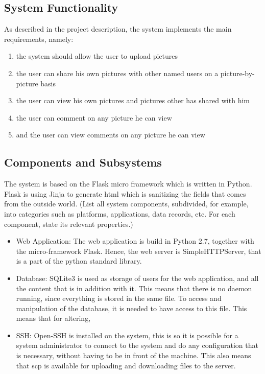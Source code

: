 \documentclass{article}
\begin{document}
\subsection{System Functionality}

As described in the project description, the system implements the main requirements, namely:

\begin{enumerate}
\item the system should allow the user to upload pictures 
\item the user can share his own pictures with other named users on a picture-by-picture basis
\item the user can view his own pictures and pictures other has shared with him
\item the user can comment on any picture he can view
\item and the user can view comments on any picture he can view  
\end{enumerate}



\subsection{Components and Subsystems}
The system is based on the Flask micro framework which is written in Python. Flask is using Jinja to generate html which is sanitizing the fields that comes from the outside world. 
(List all system components, subdivided, for example, into
  categories such as platforms, applications, data records, etc. For
  each component, state its relevant properties.)
  
\begin{itemize}
\item Web Application: The web application is build in Python 2.7, together with the micro-framework Flask. Hence, the web server is SimpleHTTPServer, that is a part of the python standard library.

\item Database: SQLite3 is used as storage of users for the web application, and all the content that is in addition with it. This means that there is no daemon running, since everything is stored in the same file. To access and manipulation of the database, it is needed to have access to this file. This means that for altering, 

\item SSH: Open-SSH is installed on the system, this is so it is possible for a system administrator to connect to the system and do any configuration that is necessary, without having to be in front of the machine. This also means that scp is available for uploading and downloading files to the server. 
\end{itemize}
\end{document}
